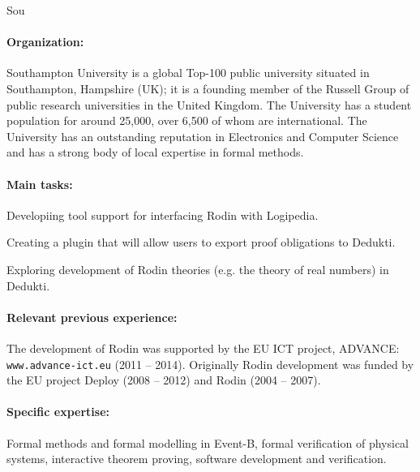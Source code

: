 \begin{sitedescription}{Sou}

\paragraph{Organization:}
Southampton University is a global Top-100 public university situated in Southampton, Hampshire (UK); it is a founding member of the Russell Group of public research universities in the United Kingdom. The University has a student population for around 25,000, over 6,500 of whom are international. The University has an outstanding reputation in Electronics and Computer Science and has a strong body of local expertise in formal methods.

\paragraph{Main tasks:}
\begin{compactitem}
\item Developiing tool support for interfacing Rodin with Logipedia.  
\item Creating a plugin that will allow users to export proof obligations to Dedukti.
\item Exploring development of Rodin theories (e.g. the theory of real numbers) in Dedukti.
\end{compactitem}


\paragraph{Relevant previous experience:}
The development of Rodin was supported by the EU ICT project, ADVANCE: \texttt{www.advance-ict.eu} (2011 -- 2014). Originally Rodin development was funded by the EU project Deploy (2008 -- 2012) and Rodin (2004 -- 2007).

\paragraph{Specific expertise:}
Formal methods and formal modelling in Event-B, formal verification of physical systems, interactive theorem proving, software development and verification.


\end{sitedescription}

